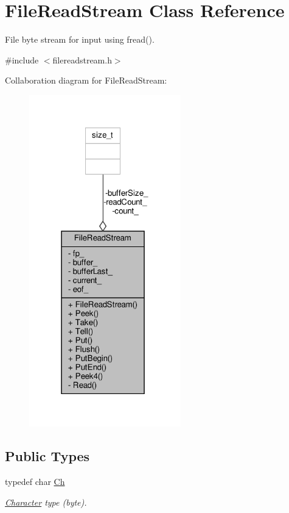 \hypertarget{classFileReadStream}{}\section{File\+Read\+Stream Class Reference}
\label{classFileReadStream}


File byte stream for input using fread().  




{\ttfamily \#include $<$filereadstream.\+h$>$}



Collaboration diagram for File\+Read\+Stream\+:
\nopagebreak
\begin{figure}[H]
\begin{center}
\leavevmode
\includegraphics[width=187pt]{classFileReadStream__coll__graph}
\end{center}
\end{figure}
\subsection*{Public Types}
\begin{DoxyCompactItemize}
\item 
typedef char \hyperlink{classFileReadStream_ae1f83d9ca3c76d1d151af0b6c427f046}{Ch}
\begin{DoxyCompactList}\small\item\em \hyperlink{structCharacter}{Character} type (byte). \end{DoxyCompactList}\end{DoxyCompactItemize}

